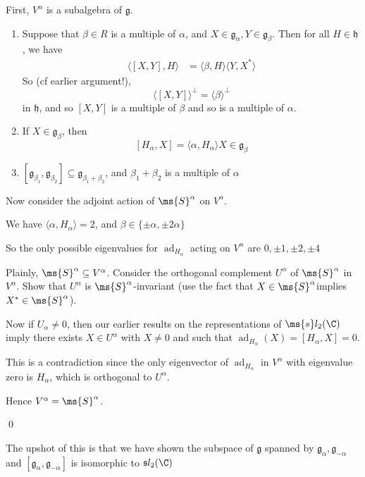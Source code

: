 \documentclass[x11names,reqno,14pt]{extarticle}
\newcommand{\mk}[1]{\mathfrak{#1}}
\newcommand{\g}{\mk{g}}
\newcommand{\h}{\mk{h}}
\DeclareMathOperator{\ad}{ad}
\begin{document}
\claim

First, $V^\alpha$ is a subalgebra of $\g$. 

\proof


\begin{enumerate}

\item Suppose that $\beta\in R$ is a multiple of $\alpha$, and $X \in \g_\alpha, Y \in \g_{\beta}$. Then for all $H \in \h$, we have
\begin{align*}
\langle[X,Y],H\rangle & = \langle\beta,H\rangle\langle Y, X^*\rangle
\end{align*}
So (cf earlier argument!), 
\[
\langle [X,Y]\rangle^\perp = \langle\beta\rangle^\perp
\]
in $\h$, and so $[X,Y]$ is a multiple of $\beta$ and so is a multiple of $\alpha$. 


\item If $X\in\g_\beta$, then 
\[
[H_\alpha,X] = \langle\alpha,H_\alpha\rangle X \in \g_\beta
\]

\item $[\g_{\beta_1},\g_{\beta_2}] \subseteq \g_{\beta_1 + \beta_2}$, and $\beta_1 + \beta_2$ is a multiple of $\alpha$ 

\end{enumerate}

Now consider the adjoint action of $\ms{S}^\alpha$ on $V^\alpha$. 

We have $\langle\alpha,H_\alpha \rangle = 2$, and $\beta\in \{\pm\alpha,\pm2\alpha\}$

So the only possible eigenvalues for $\ad_{H_\alpha}$ acting on $V^\alpha$ are $0, \pm1,\pm2,\pm4$


Plainly, $\ms{S}^\alpha\subseteq V^\alpha$. Consider the orthogonal complement $U^\alpha$ of $\ms{S}^\alpha$ in $V^\alpha$. Show that $U^\alpha$ is $\ms{S}^\alpha$-invariant (use the fact that $X \in \ms{S}^\alpha $implies $X^*\in\ms{S}^\alpha$). 

Now if $U_\alpha\neq0$, then our earlier results on the representations of $\ms{s}l_2(\C)$ imply there exists $X \in U^\alpha$ with $X\neq0$ and such that $\ad_{H_\alpha}(X) = [H_\alpha,X] = 0$. 

This is a contradiction since the only eigenvector of $\ad_{H_\alpha}$ in $V^\alpha$ with eigenvalue zero is $H_\alpha$, which is orthogonal to $U^\alpha$. 

Hence $V^\alpha = \ms{S}^\alpha$. 

\qed

The upshot of this is that we have shown the subspace of $\g$ spanned by $\g_\alpha,\g_{-\alpha}$ and $[\g_\alpha,\g_{-\alpha}]$ is isomorphic to $\mk{s} l_2(\C)$ 
\end{document}
